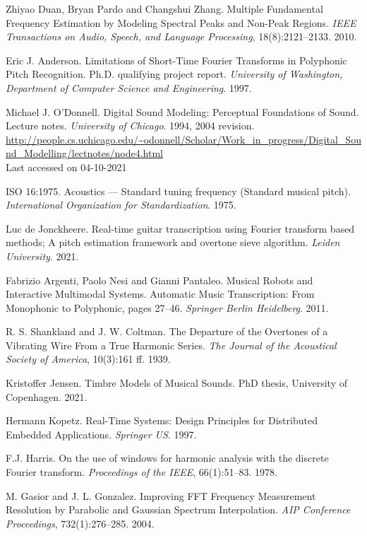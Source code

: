 \documentclass[a4paper,10pt,twocolumn]{article}
\begin{document}
\begin{thebibliography}{XX}
Zhiyao Duan, Bryan Pardo and Changshui Zhang. Multiple Fundamental Frequency Estimation by Modeling Spectral Peaks and Non-Peak Regions. \textit{IEEE Transactions on Audio, Speech, and Language Processing}, 18(8):2121--2133. 2010.

Eric J. Anderson. Limitations of Short-Time Fourier Transforms in Polyphonic Pitch Recognition. Ph.D. qualifying project report. \textit{University of Washington, Department of Computer Science and Engineering}. 1997.

Michael J. O'Donnell. Digital Sound Modeling: Perceptual Foundations of Sound. Lecture notes. \textit{University of Chicago}. 1994, 2004 revision.\\
\url{http://people.cs.uchicago.edu/~odonnell/Scholar/Work_in_progress/Digital_Sound_Modelling/lectnotes/node4.html}\\
Last accessed on 04-10-2021

ISO 16:1975. Acoustics — Standard tuning frequency (Standard musical pitch). \textit{International Organization for Standardization}. 1975.

Luc de Jonckheere. Real-time guitar transcription using Fourier transform based methods; A pitch estimation framework and overtone sieve algorithm. \textit{Leiden University}. 2021.

Fabrizio Argenti, Paolo Nesi and Gianni Pantaleo. Musical Robots and Interactive Multimodal Systems. Automatic Music Transcription: From Monophonic to Polyphonic, pages 27--46. \textit{Springer Berlin Heidelberg}. 2011.

R. S. Shankland and J. W. Coltman. The Departure of the Overtones of a Vibrating Wire From a True Harmonic Series. \textit{The Journal of the Acoustical Society of America}, 10(3):161 ff. 1939.

Kristoffer Jensen. Timbre Models of Musical Sounds. PhD thesis, University of Copenhagen. 2021.

Hermann Kopetz. Real-Time Systems: Design Principles for Distributed Embedded Applications. \textit{Springer US}. 1997.

F.J. Harris. On the use of windows for harmonic analysis with the discrete Fourier transform. \textit{Proceedings of the IEEE}, 66(1):51--83. 1978.

M. Gasior and J. L. Gonzalez. Improving FFT Frequency Measurement Resolution by Parabolic and Gaussian Spectrum Interpolation. \textit{AIP Conference Proceedings}, 732(1):276--285. 2004.


\end{thebibliography}
\end{document}

